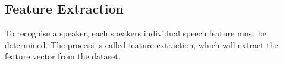 \subsection*{Feature Extraction}
To recognise a speaker, each speakers individual speech feature must be determined. 
The process is called feature extraction, which will extract the feature vector from the dataset.
